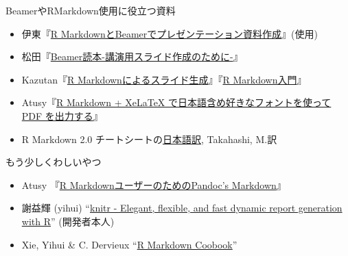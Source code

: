 \documentclass[
  12pt,
  ignorenonframetext,
]{beamer}
\providecommand{\tightlist}{%
  \setlength{\itemsep}{0pt}\setlength{\parskip}{0pt}}
\begin{document}
\begin{frame}{BeamerやRMarkdown使用に役立つ資料}
\protect\hypertarget{beamerux3084rmarkdownux4f7fux7528ux306bux5f79ux7acbux3064ux8cc7ux6599}{}

\begin{itemize}
\tightlist
\item
  伊東『\href{https://www.slideshare.net/hirokito/r-markdownbeamer-88777082}{R
  MarkdownとBeamerでプレゼンテーション資料作成}』(\LuaLaTeX 使用)
\item
  松田『\href{http://ayapin-film.sakura.ne.jp/LaTeX/slides.html\#beamer}{Beamer読本-講演用スライド作成のために-}』
\item
  Kazutan『\href{https://kazutan.github.io/SappoRoR6/rmd_slide.html\#/}{R
  Markdownによるスライド生成}』『\href{https://kazutan.github.io/kazutanR/Rmd_intro.html}{R
  Markdown入門}』
\item
  Atusy『\href{https://blog.atusy.net/2019/05/14/rmd2pdf-any-font/}{R
  Markdown + XeLaTeX で日本語含め好きなフォントを使って PDF
  を出力する}』
\item
  R Markdown 2.0
  チートシートの\href{https://rstudio.com/wp-content/uploads/2016/11/Rmarkdown-cheatsheet-2.0_ja.pdf}{日本語訳},
  Takahashi, M.訳
\end{itemize}

\end{frame}

\begin{frame}{もう少しくわしいやつ}
\protect\hypertarget{ux3082ux3046ux5c11ux3057ux304fux308fux3057ux3044ux3084ux3064}{}

\begin{itemize}
\tightlist
\item
  Atusy 『\href{https://atusy.booth.pm/items/1453002}{R
  MarkdownユーザーのためのPandoc's Markdown}』
\item
  謝益輝 (yihui) ``\href{https://yihui.org/knitr/}{knitr - Elegant,
  flexible, and fast dynamic report generation with R}'' (開発者本人)
\item
  Xie, Yihui \& C. Dervieux
  ``\href{https://bookdown.org/yihui/rmarkdown-cookbook/}{R Markdown
  Coobook}''
\end{itemize}

\end{frame}
\end{document}
